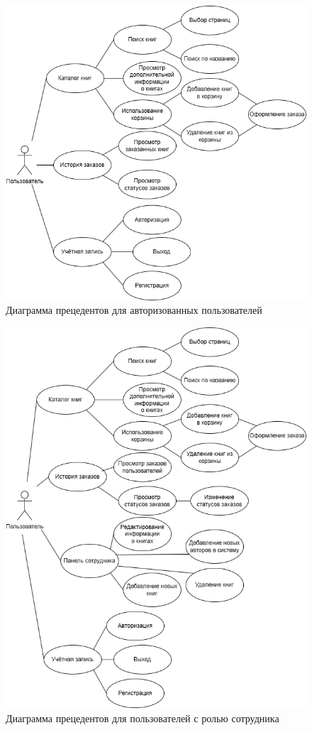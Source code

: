 \begin{figure}[H]
	\centering
	\includegraphics[width=0.7\linewidth]{"images/Авторизованные"}
	\caption{Диаграмма прецедентов для авторизованных пользователей}
	\label{fig:--}
\end{figure}

\begin{figure}[H]
	\centering
	\includegraphics[width=0.7\linewidth]{"images/Сотрудники"}
	\caption{Диаграмма прецедентов для пользователей с ролью сотрудника}
	\label{fig:--}
\end{figure}

